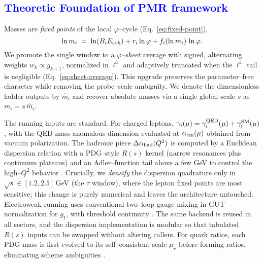\documentclass[%
 amsmath,amssymb,
 aps,
prb,
floatfix, showkeys
]{revtex4-2}
\newcommand{\modif}[1]{\textcolor{blue}{#1}}
\begin{document}
 \modif{ 
   \section{ Theoretic Foundation of PMR framework  }
\label{s-2}
 }





















 Masses are \emph{fixed points} of the
local $\varphi$--cycle (Eq.~\eqref{eq:fixed-point}),
\begin{equation}
  \label{eq:fixed-point}
\ln m_i \;=\; \ln(B_iE_{\rm coh}) + r_i\ln\varphi + f_i(\ln m_i)\,\ln\varphi.
\end{equation}
We promote the single window to a \emph{$\varphi$--sheet} average with signed,
alternating weights $w_k\propto g_{k+1}$, normalized in $\ell^1$ and adaptively
truncated when the $\ell^1$ tail is negligible (Eq.~\eqref{eq:sheet-average}). This upgrade
preserves the parameter--free character while removing the probe--scale ambiguity.
We denote the dimensionless ladder outputs by $\hat m_i$ and recover absolute masses
via a single global scale $s$ as $m_i = s\,\hat m_i$.





The running inputs are standard. For charged leptons,
$\gamma_i(\mu)=\gamma^{\rm QED}_i(\mu)+\gamma^{\rm SM}_i(\mu)$, with the QED mass anomalous
dimension evaluated at $\alpha_{\rm em}(\mu)$ obtained from vacuum polarization.
The hadronic piece $\Delta\alpha_{\rm had}(Q^2)$ is computed by a Euclidean dispersion
relation with a PDG--style $R(s)$ kernel (narrow resonances plus continuum plateaus)
and an Adler--function tail above a few GeV to control the high--$Q^2$ behavior
\cite{EidelmanJegerlehner1995,Jegerlehner2003,Keshavarzi2019,Davier2017}. Crucially,
we \emph{densify} the dispersion quadrature only in $\sqrt{s}\!\in[1.2,2.5]$\,GeV
(the $\tau$ window), where the lepton fixed points are most sensitive; this change
is purely numerical and leaves the architecture untouched. Electroweak running uses
conventional two--loop gauge mixing in GUT normalization for $g_1$, with
threshold continuity \cite{MachacekVaughn1983-85,Buttazzo2013}. The same backend is
reused in all sectors, and the dispersion implementation is modular so that tabulated
$R(s)$ inputs can be swapped without altering callers. For quark ratios, each
PDG mass is first evolved to its self–consistent scale $\mu_\star$ before forming ratios,
eliminating scheme ambiguities \cite{ChetyrkinKuehnSteinhauser2000,HerrenSteinhauser2018}.
\end{document}
